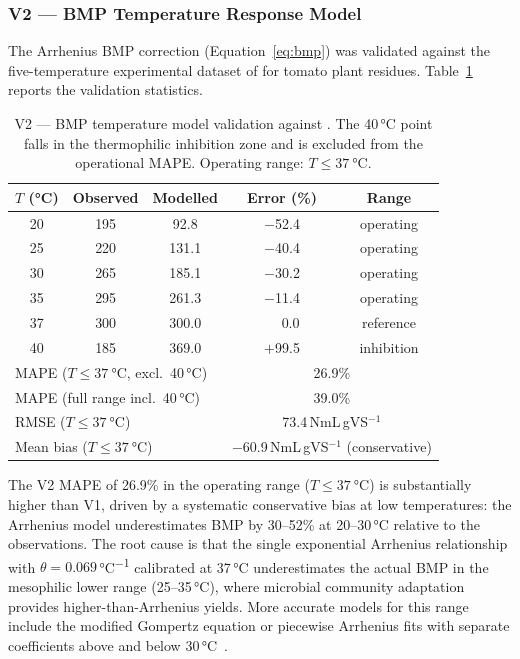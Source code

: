 \subsubsection{V2 --- BMP Temperature Response Model}

\hspace{1cm}The Arrhenius BMP correction (Equation~\ref{eq:bmp})
was validated against the five-temperature experimental dataset of
\citet{feng2013} for tomato plant residues. Table~\ref{tab:v2}
reports the validation statistics.

\begin{table}[H]
	\caption{V2 --- BMP temperature model validation against
		\citet{feng2013}. The 40\,\si{\celsius} point falls in the
		thermophilic inhibition zone and is excluded from the operational
		MAPE. Operating range: $T \leq \SI{37}{\celsius}$.}
	\label{tab:v2}
	\centering
	\begin{tabular}{ccccc}
		\toprule
		$T$ (\si{\celsius}) & Observed & Modelled
		& Error (\%) & Range \\
		\midrule
		20 & 195 & 92.8  & $-$52.4 & operating \\
		25 & 220 & 131.1 & $-$40.4 & operating \\
		30 & 265 & 185.1 & $-$30.2 & operating \\
		35 & 295 & 261.3 & $-$11.4 & operating \\
		37 & 300 & 300.0 & $\phantom{-}$0.0 & reference \\
		40 & 185 & 369.0 & $+$99.5 & inhibition \\
		\midrule
		\multicolumn{3}{l}{MAPE ($T \leq \SI{37}{\celsius}$, excl.\ 40\,\si{\celsius})}
		& \multicolumn{2}{c}{26.9\%} \\
		\multicolumn{3}{l}{MAPE (full range incl.\ 40\,\si{\celsius})}
		& \multicolumn{2}{c}{39.0\%} \\
		\multicolumn{3}{l}{RMSE ($T \leq \SI{37}{\celsius}$)}
		& \multicolumn{2}{c}{73.4\,NmL\,gVS$^{-1}$} \\
		\multicolumn{3}{l}{Mean bias ($T \leq \SI{37}{\celsius}$)}
		& \multicolumn{2}{c}{$-$60.9\,NmL\,gVS$^{-1}$ (conservative)} \\
		\bottomrule
	\end{tabular}
\end{table}

The V2 MAPE of 26.9\% in the operating range ($T \leq \SI{37}{\celsius}$)
is substantially higher than V1, driven by a systematic conservative
bias at low temperatures: the Arrhenius model underestimates BMP by
30--52\% at 20--30\,\si{\celsius} relative to the
\citet{feng2013} observations. The root cause is that the single
exponential Arrhenius relationship with $\theta = 0.069$\,\si{\celsius^{-1}}
calibrated at 37\,\si{\celsius} underestimates the actual BMP in
the mesophilic lower range (25--35\,\si{\celsius}), where microbial
community adaptation provides higher-than-Arrhenius yields. More
accurate models for this range include the modified Gompertz
equation or piecewise Arrhenius fits with separate coefficients
above and below 30\,\si{\celsius}~\citep{zwietering1990}.

